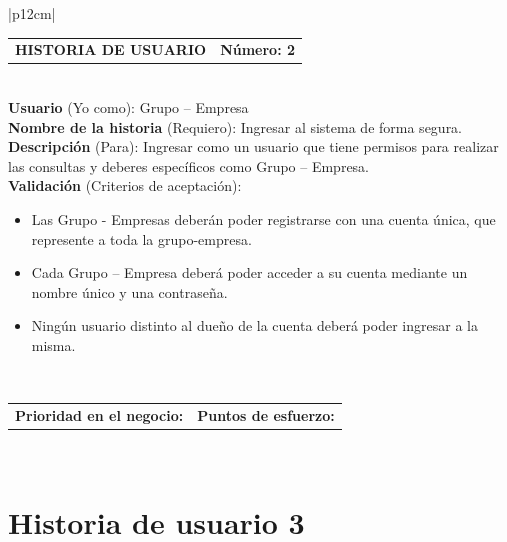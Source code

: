 \documentclass[11pt,letterpaper]{report}
\begin{document}
	\begin{center}	
	\begin{tabular}{|p{12cm}|}
		\hline
		\begin{tabular}{c|c}
			\textbf{HISTORIA DE USUARIO} & \textbf{Número: 2} \\
		\end{tabular} \\ \hline
		\textbf{Usuario} (Yo como): Grupo – Empresa \\ \hline
		\textbf{Nombre de la historia} (Requiero): Ingresar al sistema de forma segura. \\ \hline
		\textbf{Descripción} (Para): Ingresar como un usuario que tiene permisos para realizar las consultas y deberes específicos como Grupo – Empresa. \\ \hline
		\textbf{Validación} (Criterios de aceptación): \\
		\begin{minipage}{12cm}
			\begin{itemize}
				\item Las Grupo - Empresas deberán poder registrarse con una cuenta única, que represente a toda la grupo-empresa.
				\item Cada Grupo – Empresa deberá poder acceder a su cuenta mediante un nombre único y una contraseña.
				\item Ningún usuario distinto al dueño de la cuenta deberá poder ingresar a la misma.
			\end{itemize}
		\end{minipage} \\ \hline
		\begin{tabular}{c|c}
			\textbf{Prioridad en el negocio: } & \textbf{Puntos de esfuerzo: } \\
		\end{tabular} \\ \hline
	\end{tabular}
	\end{center}
	
	\section{Historia de usuario 3}
	
\end{document}

